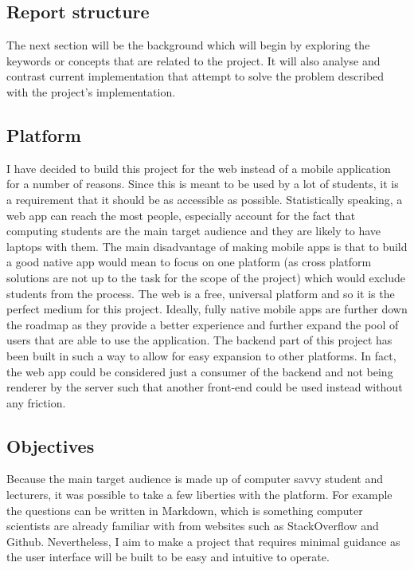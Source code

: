 \documentclass[12pt]{article}
\begin{document}
\subsection{Report structure}
The next section will be the background which will begin by exploring the keywords or concepts that are related to the project.
It will also analyse and contrast current implementation that attempt to solve the problem described with the project's implementation.

\subsection{Platform}
I have decided to build this project for the web instead of a mobile application for a number of reasons. Since this is meant to be used by a lot of students, it is a requirement that it should be as accessible as possible. Statistically speaking, a web app can reach the most people, especially account for the fact that computing students are the main target audience and they are likely to have laptops with them.
The main disadvantage of making mobile apps is that to build a good native app would mean to focus on one platform (as cross platform solutions are not up to the task for the scope of the project) which would exclude students from the process. The web is a free, universal platform and so it is the perfect medium for this project.
Ideally, fully native mobile apps are further down the roadmap as they provide a better experience and further expand the pool of users that are able to use the application.
The backend part of this project has been built in such a way to allow for easy expansion to other platforms. In fact, the web app could be considered just a consumer of the backend and not being renderer by the server such that another front-end could be used instead without any friction.



\subsection{Objectives}
Because the main target audience is made up of computer savvy student and lecturers, it was possible to take a few liberties with the platform. For example the questions can be written in Markdown, which is something computer scientists are already familiar with from websites such as StackOverflow and Github.
Nevertheless, I aim to make a project that requires minimal guidance as the user interface will be built to be easy and intuitive to operate.
\end{document}
